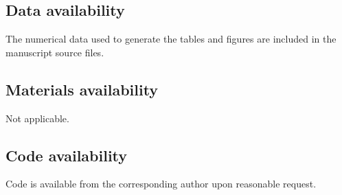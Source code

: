 \documentclass[pdflatex,sn-mathphys-num]{sn-jnl}
\theoremstyle{thmstyleone}%
\theoremstyle{thmstylethree}%
\theoremstyle{thmstyletwo}%
\begin{document}
\subsection*{Data availability}
The numerical data used to generate the tables and figures are included in the manuscript source files.

\subsection*{Materials availability}
Not applicable.

\subsection*{Code availability}
Code is available from the corresponding author upon reasonable request.
\end{document}
